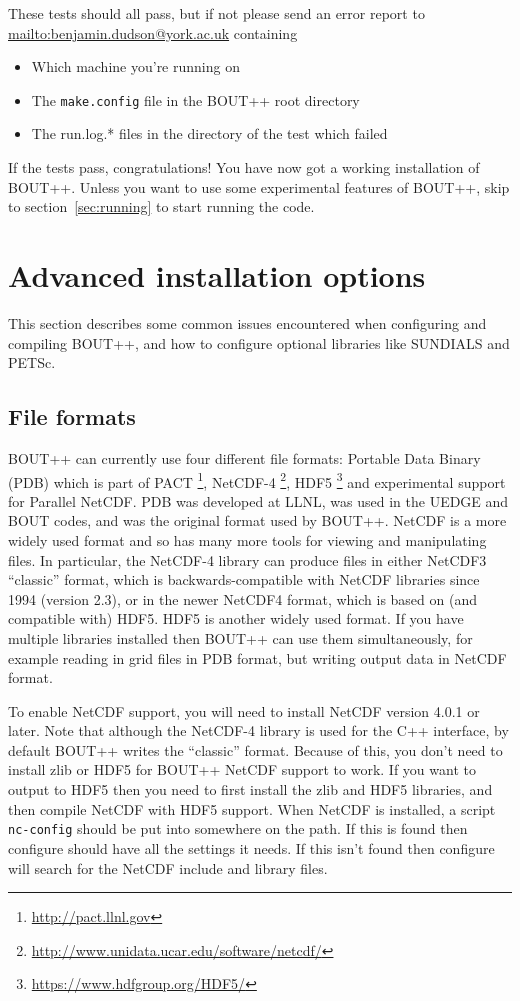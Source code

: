 \documentclass[12pt]{article}
\begin{document}
These tests should all pass, but if not please send an error report to
\url{mailto:benjamin.dudson@york.ac.uk} containing
%
\begin{itemize}
\item Which machine you're running on
\item The \texttt{make.config} file in the BOUT++ root directory
\item The run.log.* files in the directory of the test which failed
\end{itemize}
%
If the tests pass, congratulations! You have now got a working installation of
BOUT++.  Unless you want to use some experimental features of BOUT++, skip to
section~\ref{sec:running} to start running the code.





\section{Advanced installation options}
%
\label{sec:advancedinstall}
%
This section describes some common issues encountered when configuring and
compiling BOUT++, and how to configure optional libraries like SUNDIALS and
PETSc.



\subsection{File formats}
%
BOUT++ can currently use four different file formats: Portable Data Binary
(PDB) which is part of PACT
%
\footnote{\url{http://pact.llnl.gov}}, NetCDF-4%
\footnote{\url{http://www.unidata.ucar.edu/software/netcdf/}}, HDF5%
\footnote{\url{https://www.hdfgroup.org/HDF5/}} and experimental support for
Parallel NetCDF.  PDB was developed at LLNL, was used in the UEDGE and BOUT
codes, and was the original format used by BOUT++. NetCDF is a more widely used
format and so has many more tools for viewing and manipulating files.  In
particular, the NetCDF-4 library can produce files in either NetCDF3
``classic'' format, which is backwards-compatible with NetCDF libraries since
1994 (version 2.3), or in the newer NetCDF4 format, which is based on (and
compatible with) HDF5. HDF5 is another widely used format. If you have multiple
libraries installed then BOUT++ can use them simultaneously, for example
reading in grid files in PDB format, but writing output data in NetCDF format.

To enable NetCDF support, you will need to install NetCDF version 4.0.1 or
later.  Note that although the NetCDF-4 library is used for the C++ interface,
by default BOUT++ writes the ``classic'' format. Because of this, you don't
need to install zlib or HDF5 for BOUT++ NetCDF support to work.  If you want to
output to HDF5 then you need to first install the zlib and HDF5 libraries, and
then compile NetCDF with HDF5 support.  When NetCDF is installed, a script
\texttt{nc-config} should be put into somewhere on the path. If this is found
then configure should have all the settings it needs. If this isn't found then
configure will search for the NetCDF include and library files.
\end{document}
